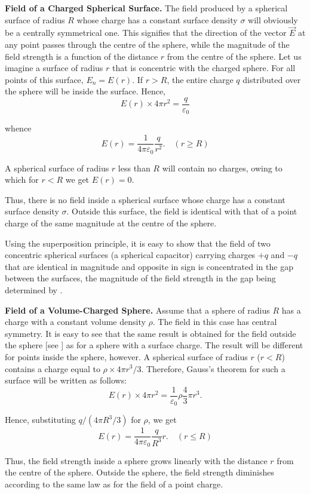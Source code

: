 \textbf{Field of a Charged Spherical Surface.} The field produced by a spherical surface of radius $R$ whose charge has a constant surface density $\sigma$ will obviously be a centrally symmetrical one. This signifies that the direction of the vector $\vec{E}$ at any point passes through the centre of the sphere, while the magnitude of the field strength is a function of the distance $r$ from the centre of the sphere. Let us imagine a surface of radius $r$ that is concentric with the charged sphere. For all points of this surface, $E_n=E(r)$. If $r>R$, the entire charge $q$ distributed over the sphere will be inside the surface. Hence,
\begin{equation*}
	E(r)\times 4\pi r^2 = \frac{q}{\varepsilon_0}
\end{equation*}

\noindent
whence
\begin{equation}\label{eq:1_124}
	E(r) = \frac{1}{4\pi\varepsilon_0}\frac{q}{r^2}.\quad (r\geqslant R)
\end{equation}

A spherical surface of radius $r$ less than $R$ will contain no charges, owing to which for $r<R$ we get $E(r)=0$.

Thus, there is no field inside a spherical surface whose charge has a constant surface density $\sigma$. Outside this surface, the field is identical with that of a point charge of the same magnitude at the
centre of the sphere.

Using the superposition principle, it is easy to show that the field of two concentric spherical surfaces (a spherical capacitor) carrying charges $+q$ and $-q$ that are identical in magnitude and opposite in sign is concentrated in the gap between the surfaces, the magnitude of the field strength in the gap being determined by .

\textbf{Field of a Volume-Charged Sphere.} Assume that a sphere of radius $R$ has a charge with a constant volume density $\rho$. The field in this case has central symmetry. It is easy to see that the same result is obtained for the field outside the sphere [see ] as for a sphere with a surface charge. The result will be different for points inside the sphere, however. A spherical surface of radius $r$ ($r<R$) contains a charge equal to $\rho\times 4\pi r^3/3$. Therefore, Gauss's theorem for such a surface will be written as follows:
\begin{equation*}
	E(r)\times 4\pi r^2 = \frac{1}{\varepsilon_0}\rho \frac{4}{3}\pi r^3.
\end{equation*}

\noindent
Hence, substituting $q/(4\pi R^3/3)$ for $\rho$, we get
\begin{equation}\label{eq:1_125}
	E(r) = \frac{1}{4\pi\varepsilon_0}\frac{q}{R^3}r.\quad (r\leqslant R)
\end{equation}

Thus, the field strength inside a sphere grows linearly with the distance $r$ from the centre of the sphere. Outside the sphere, the field strength diminishes according to the same law as for the field of a point charge.
